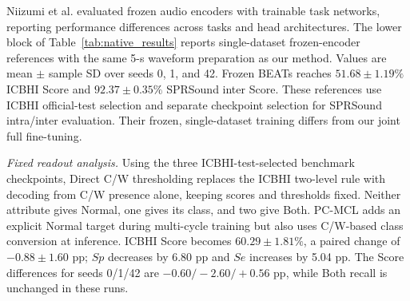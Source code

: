 Niizumi et al.\cite{niizumi2025foundationeval} evaluated frozen audio
encoders with trainable task networks, reporting performance differences
across tasks and head architectures. The lower block of
Table~\ref{tab:native_results} reports single-dataset frozen-encoder
references with the same 5-s waveform preparation as our method.
Values are mean $\pm$ sample SD over seeds 0, 1, and 42.
Frozen BEATs reaches $51.68\pm1.19\%$ ICBHI Score and
$92.37\pm0.35\%$ SPRSound inter Score.
These references use ICBHI official-test selection and separate checkpoint
selection for SPRSound intra/inter evaluation. Their frozen, single-dataset
training differs from our joint full fine-tuning.

\textit{Fixed readout analysis.}
Using the three ICBHI-test-selected benchmark checkpoints, Direct C/W
thresholding replaces the ICBHI two-level rule with decoding from C/W
presence alone, keeping scores and thresholds fixed. Neither attribute gives
Normal, one gives its class, and two give Both. PC-MCL adds an explicit
Normal target during multi-cycle training but also uses C/W-based class
conversion at inference\cite{jeong2026pcmcl}.
ICBHI Score becomes $60.29\pm1.81\%$, a paired change of
$-0.88\pm1.60$ pp; $Sp$ decreases by 6.80 pp and $Se$ increases by
5.04 pp. The Score differences for seeds 0/1/42 are
$-0.60/-2.60/+0.56$ pp, while Both recall is unchanged in these runs.

